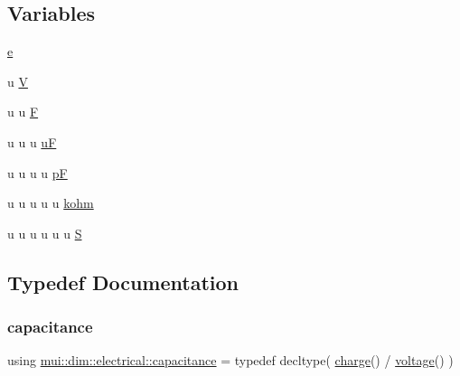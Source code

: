 \subsection*{Variables}
\begin{DoxyCompactItemize}
\item 
\hyperlink{namespacemui_1_1dim_1_1electrical_a86b1ddac293d180e598a01ec44be38c9}{e}
\item 
u \hyperlink{namespacemui_1_1dim_1_1electrical_ae363ee1b29b87ebaa4b071fa65da942b}{V}
\item 
u u \hyperlink{namespacemui_1_1dim_1_1electrical_acba0e3b89050f466c888f46b771f0bd5}{F}
\item 
u u u \hyperlink{namespacemui_1_1dim_1_1electrical_a0ab95883145fc50dacfdffc8b2aa1ab1}{uF}
\item 
u u u u \hyperlink{namespacemui_1_1dim_1_1electrical_a5b3632cc79506df0cf951b5e6b120287}{pF}
\item 
u u u u u \hyperlink{namespacemui_1_1dim_1_1electrical_a4d33d4d385a110d1f5edc7c5da366d62}{kohm}
\item 
u u u u u u \hyperlink{namespacemui_1_1dim_1_1electrical_a5d45a98b3947688a16816ebe6e749a2d}{S}
\end{DoxyCompactItemize}


\subsection{Typedef Documentation}
\mbox{\label{namespacemui_1_1dim_1_1electrical_ab6fce13543150792566ab8449ce7ef0e}} 
\subsubsection{\texorpdfstring{capacitance}{capacitance}}
{\footnotesize\ttfamily using \hyperlink{namespacemui_1_1dim_1_1electrical_ab6fce13543150792566ab8449ce7ef0e}{mui\+::dim\+::electrical\+::capacitance} = typedef decltype( \hyperlink{namespacemui_1_1dim_1_1electrical_acd4b8cce75196ce05ff2879941d870df}{charge}() / \hyperlink{namespacemui_1_1dim_1_1electrical_a028fd928ac1e20226332a4e793bac739}{voltage}() )}

\mbox{\label{namespacemui_1_1dim_1_1electrical_acd4b8cce75196ce05ff2879941d870df}} 
